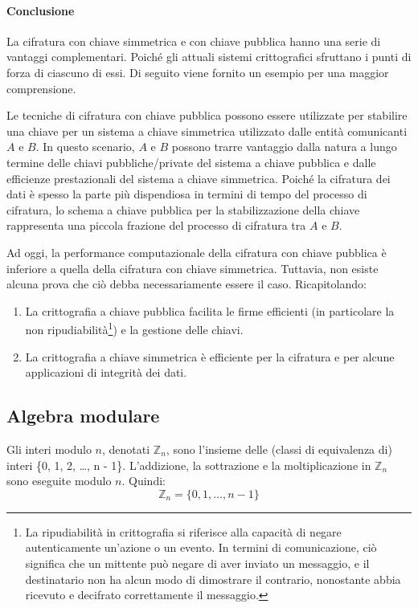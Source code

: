 \documentclass{article}
\theoremstyle{definition}
\begin{document}
\paragraph{Conclusione}
La cifratura con chiave simmetrica e con chiave pubblica hanno una serie di vantaggi complementari. Poiché gli attuali sistemi crittografici sfruttano i punti di forza di ciascuno di essi. Di seguito viene fornito un esempio per una maggior comprensione.

Le tecniche di cifratura con chiave pubblica possono essere utilizzate per stabilire una chiave per un sistema a chiave simmetrica utilizzato dalle entità comunicanti \( A \) e \( B \). In questo scenario, \( A \) e \( B \) possono trarre vantaggio dalla natura a lungo termine delle chiavi pubbliche/private del sistema a chiave pubblica e dalle efficienze prestazionali del sistema a chiave simmetrica. Poiché la cifratura dei dati è spesso la parte più dispendiosa in termini di tempo del processo di cifratura, lo schema a chiave pubblica per la stabilizzazione della chiave rappresenta una piccola frazione del processo di cifratura tra \( A \) e \( B \).

Ad oggi, la performance computazionale della cifratura con chiave pubblica è inferiore a quella della cifratura con chiave simmetrica. Tuttavia, non esiste alcuna prova che ciò debba necessariamente essere il caso. Ricapitolando:
\begin{enumerate}
    \item La crittografia a chiave pubblica facilita le firme efficienti (in particolare la non ripudiabilità\footnote{La ripudiabilità in crittografia si riferisce alla capacità di negare autenticamente un'azione o un evento. In termini di comunicazione, ciò significa che un mittente può negare di aver inviato un messaggio, e il destinatario non ha alcun modo di dimostrare il contrario, nonostante abbia ricevuto e decifrato correttamente il messaggio.}) e la gestione delle chiavi.
    \item La crittografia a chiave simmetrica è efficiente per la cifratura e per alcune applicazioni di integrità dei dati.
\end{enumerate}

\subsection{Algebra modulare}
Gli interi modulo \( n \), denotati \( \mathbb{Z}_n \), sono l'insieme delle (classi di equivalenza di) interi \{0, 1, 2, \ldots, n - 1\}. L'addizione, la sottrazione e la moltiplicazione in \( \mathbb{Z}_n \) sono eseguite modulo \( n \). Quindi:
\begin{equation*}
    \mathbb{Z}_n = \{0,1,\dots ,n-1\}
\end{equation*}
\end{document}
